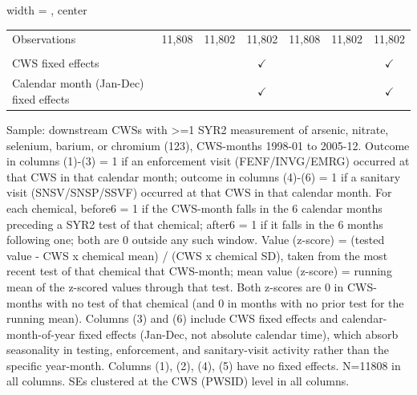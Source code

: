 \begin{table}[htbp]
\begin{adjustbox}{width = \textwidth, center}
\begin{tabular}{lcccccc}
          \\
         
         Observations                           & 11,808         & 11,802                 & 11,802          & 11,808          & 11,802          & 11,802\\  
         
          \\
         
         CWS fixed effects                      &                &                        & $\checkmark$    &                 &                 & $\checkmark$\\   
         Calendar month (Jan-Dec) fixed effects &                &                        & $\checkmark$    &                 &                 & $\checkmark$\\   
         
         \bottomrule
         
      \end{tabular}
      
      
      
   \end{adjustbox}
      {\tiny\linespread{1}\selectfont \par \raggedright 
   Sample: downstream CWSs with >=1 SYR2 measurement of arsenic, nitrate, selenium, barium, or chromium (123), CWS-months 1998-01 to 2005-12. Outcome in columns (1)-(3) = 1 if an enforcement visit (FENF/INVG/EMRG) occurred at that CWS in that calendar month; outcome in columns (4)-(6) = 1 if a sanitary visit (SNSV/SNSP/SSVF) occurred at that CWS in that calendar month. For each chemical, before6 = 1 if the CWS-month falls in the 6 calendar months preceding a SYR2 test of that chemical; after6 = 1 if it falls in the 6 months following one; both are 0 outside any such window. Value (z-score) = (tested value - CWS x chemical mean) / (CWS x chemical SD), taken from the most recent test of that chemical that CWS-month; mean value (z-score) = running mean of the z-scored values through that test. Both z-scores are 0 in CWS-months with no test of that chemical (and 0 in months with no prior test for the running mean). Columns (3) and (6) include CWS fixed effects and calendar-month-of-year fixed effects (Jan-Dec, not absolute calendar time), which absorb seasonality in testing, enforcement, and sanitary-visit activity rather than the specific year-month. Columns (1), (2), (4), (5) have no fixed effects. N=11808 in all columns. SEs clustered at the CWS (PWSID) level in all columns.}
   
\end{table}


